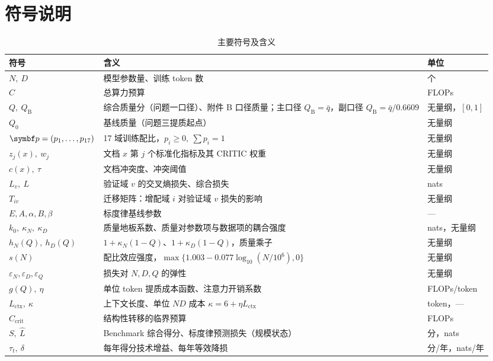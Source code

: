 \section{符号说明}

\begin{table}[H]
\centering\small
\caption{主要符号及含义}
\label{tab:symbol}
\begin{tabular}{p{2.6cm}p{9.6cm}l}
\toprule
符号 & 含义 & 单位 \\
\midrule
$N,\ D$ & 模型参数量、训练 token 数 & 个 \\
$C$ & 总算力预算 & FLOPs \\
$Q,\ Q_{\mathrm B}$ & 综合质量分（问题一口径）、附件 B 口径质量；主口径 $Q_{\mathrm B}=\bar q$，副口径 $Q_{\mathrm B}=\bar q/0.6609$ & 无量纲，$[0,1]$ \\
$Q_0$ & 基线质量（问题三提质起点） & 无量纲 \\
$\bp=(p_1,\dots,p_{17})$ & 17 域训练配比，$p_i\ge0,\ \sum p_i=1$ & 无量纲 \\
$z_j(x),\ w_j$ & 文档 $x$ 第 $j$ 个标准化指标及其 CRITIC 权重 & 无量纲 \\
$c(x),\ \tau$ & 文档冲突度、冲突阈值 & 无量纲 \\
$L_v,\ L$ & 验证域 $v$ 的交叉熵损失、综合损失 & nats \\
$T_{iv}$ & 迁移矩阵：增配域 $i$ 对验证域 $v$ 损失的影响 & 无量纲 \\
$E,A,\alpha,B,\beta$ & 标度律基线参数 & — \\
$k_0,\ \kappa_N,\ \kappa_D$ & 质量地板系数、质量对参数项与数据项的耦合强度 & nats，无量纲 \\
$h_N(Q),\ h_D(Q)$ & $1+\kappa_N(1-Q)$、$1+\kappa_D(1-Q)$，质量乘子 & 无量纲 \\
$s(N)$ & 配比效应强度，$\max\{1.003-0.077\log_{10}(N/10^6),0\}$ & 无量纲 \\
$\varepsilon_N,\varepsilon_D,\varepsilon_Q$ & 损失对 $N,D,Q$ 的弹性 & 无量纲 \\
$g(Q),\ \eta$ & 单位 token 提质成本函数、注意力开销系数 & FLOPs/token \\
$L_{\mathrm{ctx}},\ \kappa$ & 上下文长度、单位 $ND$ 成本 $\kappa=6+\eta L_{\mathrm{ctx}}$ & token，— \\
$C_{\mathrm{crit}}$ & 结构性转移的临界预算 & FLOPs \\
$S,\ \hat L$ & Benchmark 综合得分、标度律预测损失（规模状态） & 分，nats \\
$\tau_t,\ \delta$ & 每年得分技术增益、每年等效降损 & 分/年，nats/年 \\
\bottomrule
\end{tabular}
\end{table}

